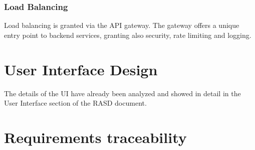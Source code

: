 \documentclass{Configuration_Files/PoliMi3i_thesis}
\begin{document}
\subsection{Load Balancing}
Load balancing is granted via the API gateway. The gateway offers a unique entry point to backend services, granting also security, rate limiting and logging.

\chapter{User Interface Design}
The details of the UI have already been analyzed and showed in detail in the User Interface section of the RASD document.

\chapter{Requirements traceability}
\end{document}
